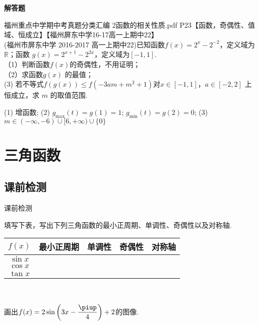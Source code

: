 \begin{exercise}{\bf 解答题}
    \item 福州重点中学期中考真题分类汇编 2函数的相关性质.pdf P23【函数，奇偶性、值域、恒成立】【福州屏东中学16-17高一上期中22】\\
     (福州市屏东中学 2016-2017 高一上期中22)已知函数$f(x)=2^x-2^{-2} $，定义域为$\mathbb{R} $；函数 $g(x)=2^{x+1}-2^{2x} $，定义域为$[-1,1] $.\\
     （1）判断函数$f(x) $的奇偶性，不用证明；\\
     （2）求函数$g(x) $ 的最值；\\
      (3) 若不等式$f(g(x))\leq f(-3am+m^2+1) $对$x\in[-1,1] $，$a\in[-2,2] $ 上恒成立，求 $m$ 的取值范围.
      \begin{answer}
       (1) 增函数;
       (2) $g_{\max}(t)=g(1)=1 $; $g_{\min}(t)=g(2)=0 $;
       (3) $m\in (-\infty,-6)\cup[6,+\infty)\cup\{0\} $
      \end{answer}
    \end{exercise}
\section{三角函数}
  \subsection{课前检测}
  \begin{exercise}{\heiti 课前检测}\\
    \item
      填写下表，写出下列三角函数的最小正周期、单调性、奇偶性以及对称轴.
      \begin{center}
        \renewcommand{\arraystretch}{1.4}
        \begin{tabular}{|c|c|c|c|c|}
          \hline
        $f(x)$&\mbox{最小正周期}&\mbox{\hspace{8em}单调性\hspace{8em}}&奇偶性&\mbox{\hspace{3em}对称轴\hspace{3em}}\\
          \hline
          $\sin x$&&&&\\
          \hline
          $\cos x$&&&&\\
          \hline
          $\tan x$&&&&\\
          \hline
        \end{tabular}\\
      \end{center}
    \item
      画出$f(x)=2\sin \left(3x-\dfrac{\piup}4 \right)+2$的图像.\\
    \vspace{0.8cm}
  \end{exercise}
